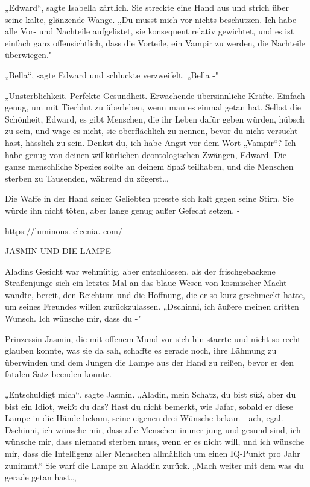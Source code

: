 {„Edward“, sagte Isabella zärtlich. Sie streckte eine Hand aus und strich über seine kalte, glänzende Wange. „Du musst mich vor nichts beschützen. Ich habe alle Vor- und Nachteile aufgelistet, sie konsequent relativ gewichtet, und es ist einfach ganz offensichtlich, dass die Vorteile, ein Vampir zu werden, die Nachteile überwiegen."

„Bella“, sagte Edward und schluckte verzweifelt. „Bella -"

„Unsterblichkeit. Perfekte Gesundheit. Erwachende übersinnliche Kräfte. Einfach genug, um mit Tierblut zu überleben, wenn man es einmal getan hat. Selbst die Schönheit, Edward, es gibt Menschen, die ihr Leben dafür geben würden, hübsch zu sein, und wage es nicht, sie oberflächlich zu nennen, bevor du nicht versucht hast, hässlich zu sein. Denkst du, ich habe Angst vor dem Wort „Vampir“? Ich habe genug von deinen willkürlichen deontologischen Zwängen, Edward. Die ganze menschliche Spezies sollte an deinem Spaß teilhaben, und die Menschen sterben zu Tausenden, während du zögerst.„

Die Waffe in der Hand seiner Geliebten presste sich kalt gegen seine Stirn. Sie würde ihn nicht töten, aber lange genug außer Gefecht setzen, -

\href{https://luminous.\%20elcenia.\%20com/“\%20target=}{https://luminous. elcenia. com/}

JASMIN UND DIE LAMPE

Aladins Gesicht war wehmütig, aber entschlossen, als der frischgebackene Straßenjunge sich ein letztes Mal an das blaue Wesen von kosmischer Macht wandte, bereit, den Reichtum und die Hoffnung, die er so kurz geschmeckt hatte, um seines Freundes willen zurückzulassen. „Dschinni, ich äußere meinen dritten Wunsch. Ich wünsche mir, dass du -"

Prinzessin Jasmin, die mit offenem Mund vor sich hin starrte und nicht so recht glauben konnte, was sie da sah, schaffte es gerade noch, ihre Lähmung zu überwinden und dem Jungen die Lampe aus der Hand zu reißen, bevor er den fatalen Satz beenden konnte.

„Entschuldigt mich“, sagte Jasmin. „Aladin, mein Schatz, du bist süß, aber du bist ein Idiot, weißt du das? Hast du nicht bemerkt, wie Jafar, sobald er diese Lampe in die Hände bekam, seine eigenen drei Wünsche bekam - ach, egal. Dschinni, ich wünsche mir, dass alle Menschen immer jung und gesund sind, ich wünsche mir, dass niemand sterben muss, wenn er es nicht will, und ich wünsche mir, dass die Intelligenz aller Menschen allmählich um einen IQ-Punkt pro Jahr zunimmt.“ Sie warf die Lampe zu Aladdin zurück. „Mach weiter mit dem was du gerade getan hast.„

}
